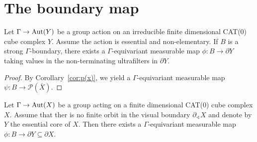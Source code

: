 \section{The boundary map}
\label{sec:map}

\begin{thm}[\cite{MR3509968}]
  Let \(\Gamma \to \operatorname{Aut}(Y)\) be a group action on an irreducible finite dimensional CAT(0) cube complex \(Y\). Assume the action is essential and non-elementary. If \(B\) is a strong \(\Gamma\)-boundary, there exists a \(\Gamma\)-equivariant measurable map \(\phi\colon B \to \partial Y\) taking values in the non-terminating ultrafilters in \(\partial Y\).
\end{thm}

\begin{proof}
  By Corollary~\ref{cor:p(x)}, we yield a \(\Gamma\)-equivariant measurable map \(\psi\colon B \to \mathcal{P}(\bar X)\). 
\end{proof}

\begin{cor}[\cite{MR3509968}]
  Let \(\Gamma \to \operatorname{Aut}(X)\) be a group acting on a finite dimensional CAT(0) cube complex \(X\). Assume that ther is no finite orbit in the visual boundary \(\partial_\sphericalangle X\) and denote by \(Y\) the essential core of \(X\). Then there exists a \(\Gamma\)-equivariant measurable map \(\phi \colon B \to \partial Y \subseteq \partial X\).
\end{cor}

